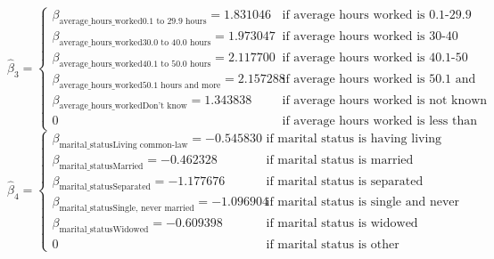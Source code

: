 \documentclass[
]{article}
\begin{document}
\begin{equation}
  \hat\beta_{3} =
    \begin{cases}
      \beta_{\text{average_hours_worked0.1 to 29.9 hours}} = 1.831046 & \text{if average hours worked is 0.1-29.9 hours}\\
      \beta_{\text{average_hours_worked30.0 to 40.0 hours}}= 1.973047 & \text{if average hours worked is 30-40 hours}\\
      \beta_{\text{average_hours_worked40.1 to 50.0 hours}}= 2.117700  & \text{if average hours worked is 40.1-50 hours}\\
      \beta_{\text{average_hours_worked50.1 hours and more}} = 2.157288 & \text{if average hours worked is 50.1 and more hours}\\
      \beta_{\text{average_hours_workedDon't know}} = 1.343838 & \text{if average hours worked is not known}\\
      0 & \text{if average hours worked is less than 0.1 hours}
    \end{cases}       
\end{equation} \begin{equation}
  \hat\beta_{4} =
    \begin{cases}
      \beta_{\text{marital_statusLiving common-law}} =  -0.545830 & \text{if marital status is having living common-law partner}\\
      \beta_{\text{marital_statusMarried}} = -0.462328 & \text{if marital status is married}\\
      \beta_{\text{marital_statusSeparated}} = -1.177676  & \text{if marital status is separated}\\
      \beta_{\text{marital_statusSingle, never married}} = -1.096904 & \text{if marital status is single and never married}\\
      \beta_{\text{marital_statusWidowed}} = -0.609398  & \text{if marital status is widowed}\\
      0 & \text{if marital status is other}
    \end{cases}       
\end{equation}
\end{document}
